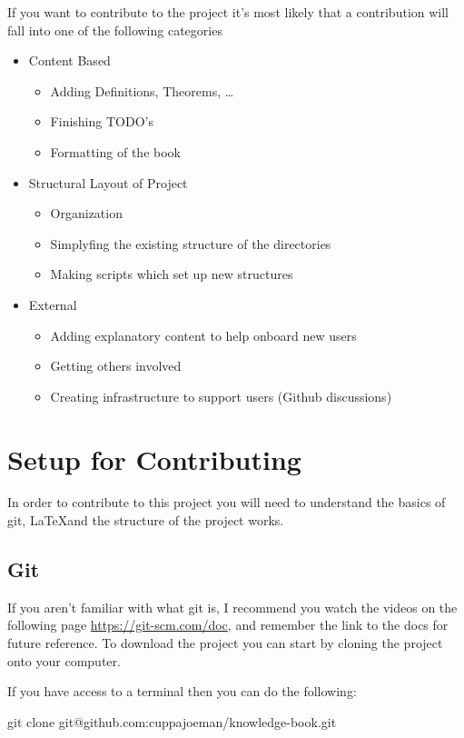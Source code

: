 If you want to contribute to the project it's most likely that a contribution will fall into one of the following categories
\begin{itemize}
  \item Content Based 
  \begin{itemize}
      \item Adding Definitions, Theorems, \ldots
      \item Finishing TODO's
      \item Formatting of the book
  \end{itemize}
  \item Structural Layout of Project 
  \begin{itemize}
      \item Organization
      \item Simplyfing the existing structure of the directories 
      \item Making scripts which set up new structures
  \end{itemize}
  \item External
  \begin{itemize}
      \item Adding explanatory content to help onboard new users
      \item Getting others involved
      \item Creating infrastructure to support users (Github discussions)
  \end{itemize}
\end{itemize}

\section*{Setup for Contributing}
In order to contribute to this project you will need to understand the basics of git, \LaTeX and the structure of the project works.

\subsection*{Git}
If you aren't familiar with what git is, I recommend you watch the videos on the following page \url{https://git-scm.com/doc}, and remember the link to the docs for future reference. To download the project you can start by cloning the project onto your computer.

If you have access to a terminal then you can do the following:

\begin{term}
git clone git@github.com:cuppajoeman/knowledge-book.git
\end{term}

